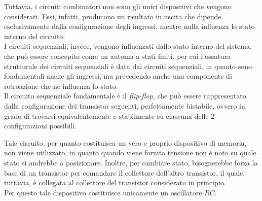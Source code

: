 \documentclass[a4paper]{extarticle}
\begin{document}
\noindent
Tuttavia, i circuiti combinatori non sono gli unici dispositivi che vengono considerati. Essi, infatti, producono un risultato in uscita che dipende esclusivamente dalla configurazione degli ingressi, mentre nulla influenza lo stato interno del circuito.\\
I circuiti sequenziali, invece, vengono influenzati dallo stato interno del sistema, che può essere concepito come un automa a stati finiti, per cui l'ossatura strutturale dei circuiti sequenziali è data dai circuiti sequenziali, in quanto sono fondamentali anche gli ingressi, ma prevedendo anche una componente di retroazione che ne influenza lo stato.\\
Il circuito sequenziale fondamentale è il \textit{flip-flop}, che può essere rappresentato dalla configurazione dei transistor seguenti, perfettamente bistabile, ovvero in grado di trovarsi equivalentemente e stabilmente su ciascuna delle \(2\) configurazioni possibili.

\begin{figure}[H]
    \centering
    \qquad
    \label{fig:flip-flop}
\end{figure}

\noindent
Tale circuito, per quanto costituisca un vero e proprio dispositivo di memoria, non viene utilizzato, in quanto quando viene fornita tensione non è noto su quale stato si andrebbe a posizionare. Inoltre, per cambiare stato, bisognerebbe forza la base di un transistor per comandare il collettore dell'altro transistor, il quale, tuttavia, è collegata al collettore del transistor considerato in principio.\\
Per questo tale dispositivo costituisce unicamente un oscillatore \(RC\).
\end{document}
